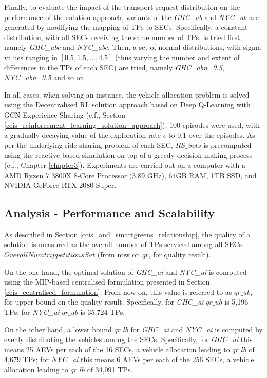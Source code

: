 Finally, to evaluate the impact of the transport request distribution on the performance of the solution approach,
variants of the \emph{GHC\_ab} and \emph{NYC\_ab} are generated by modifying the mapping of TPs to SECs.
Specifically, a constant distribution, with all SECs receiving the same number of TPs, is tried first, namely
\emph{GHC\_abc} and \emph{NYC\_abc}.
Then, a set of normal distributions, with sigma values ranging
in $[0.5, 1.5, \ldots, 4.5]$ (thus varying the number and extent of differences in the TPs of each SEC) are tried,
namely \emph{GHC\_abn\_0.5}, \emph{NYC\_abn\_0.5} and so on.

In all cases, when solving an instance, the vehicle allocation problem is solved using the Decentralised RL solution
approach based on Deep Q-Learning with GCN Experience Sharing (c.f., Section \ref{ccis_reinforcement_learning_solution_approach}).
100 episodes were used, with a gradually decaying value of the exploration rate $\epsilon$ to $0.1$ over the episodes.
As per the underlying ride-sharing problem of each SEC, $RS\_Sols$ is precomputed using the reactive-based
simulation on top of a greedy decision-making process (c.f., Chapter \ref{chapter3}).
Experiments are carried out on a computer with a AMD Ryzen 7 3800X 8-Core Processor (3.89 GHz), 64GB RAM,
1TB SSD, and NVIDIA GeForce RTX 2080 Super.

\subsection{Analysis - Performance and Scalability}
\label{analysis_performance_scalability}
As described in Section \ref{ccis_and_smartgreens_relationship}, the
quality of a solution is measured as the overall number of TPs serviced among all SECs $OverallNumtrip petitionsSat$
(from now on $qr$, for quality result).

On the one hand, the optimal solution of \emph{GHC\_ai} and \emph{NYC\_ai}
is computed
using the MIP-based centralised formulation presented in Section \ref{ccis_centralised_formulation}.
From now on, this value is referred to as $qr\_ub$, for upper-bound on the quality result.
Specifically, for \emph{GHC\_ai} $qr\_ub$ is 5,196 TPs; for \emph{NYC\_ai}
$qr\_ub$ is 35,724 TPs.

On the other hand, a lower bound $qr\_lb$ for \emph{GHC\_ai} and \emph{NYC\_ai} is computed by
evenly distributing the vehicles among the SECs.
Specifically, for \emph{GHC\_ai}
this means 25 AEVs per each of the 16 SECs, a vehicle allocation leading to $qr\_lb$ of 4,679 TPs;
for \emph{NYC\_ai}
this means 6 AEVs per each of the 256 SECs, a vehicle allocation leading to $qr\_lb$ of 34,091 TPs.

